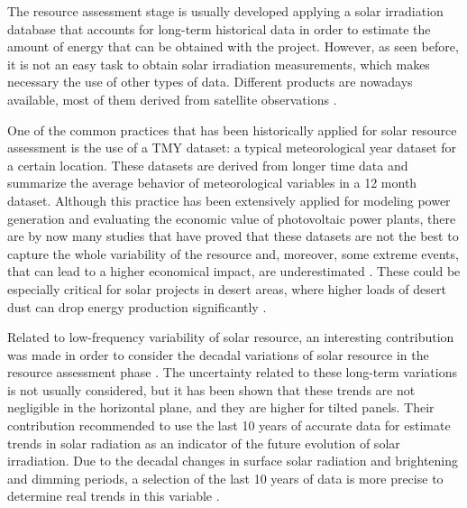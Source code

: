 The resource assessment stage is usually developed applying a solar irradiation database that accounts for long-term historical data in order to estimate the amount of energy that can be obtained with the project. However, as seen before, it is not an easy task to obtain solar irradiation measurements, which makes necessary the use of other types of data. Different products are nowadays available, most of them derived from satellite observations \cite*{nrel}.



One of the common practices that has been historically applied for solar resource assessment is the use of a TMY dataset: a typical meteorological year dataset for a certain location. These datasets are derived from longer time data and summarize the average behavior of meteorological variables in a 12 month dataset. Although this practice has been extensively applied for modeling power generation and evaluating the economic value of photovoltaic power plants, there are by now many studies that have proved that these datasets are not the best to capture the whole variability of the resource and, moreover, some extreme events, that can lead to a higher economical impact, are underestimated \cite*{Bryce2018, vignola2012b, nrel}. These could be especially critical for solar projects in desert areas, where higher loads of desert dust can drop energy production significantly \cite*{gueymard2014review}.



Related to low-frequency variability of solar resource, an interesting contribution was made in order to consider the decadal variations of solar resource in the resource assessment phase \cite*{muller2014rethinking}. The uncertainty related to these long-term variations is not usually considered, but it has been shown that these trends are not negligible in the horizontal plane, and they are higher for tilted panels. Their contribution recommended to use the last 10 years of accurate data for estimate trends in solar radiation as an indicator of the future evolution of solar irradiation. Due to the decadal changes in surface solar radiation and brightening and dimming periods, a selection of the last 10 years of data is more precise to determine real trends in this variable \cite*{muller2014rethinking}. %

